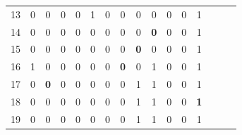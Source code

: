 \begin{esempio}
\begin{table}[H]
\begin{tabular}{c|ccccccccccccccc}
      13 & 0 & 0 & 0 & 0 & 1 & 0 & 0 & 0 & 0 & 0 & 0 & 1 \\
      14 & 0 & 0 & 0 & 0 & 0 & 0 & 0 & 0 & {\color{nordred}\textbf{0}} & 0 & 0
                                                               & 1 \\
      15 & 0 & 0 & 0 & 0 & 0 & 0 & 0 & {\color{nordred}\textbf{0}} & 0 & 0 & 0
                                                               & 1 \\
      16 & 1 & 0 & 0 & 0 & 0 & 0 & {\color{nordred}\textbf{0}} & 0 & 1 & 0 & 0
                                                               & 1 \\
      17 & 0 & {\color{nordred}\textbf{0}} & 0 & 0 & 0 & 0 & 0 & 1 & 1 & 0 & 0
                                                               & 1 \\
      18 & 0 & 0 & 0 & 0 & 0 & 0 & 0 & 1 & 1 & 0 & 0
                                         & {\color{nordred}\textbf{1}} \\ 
      19 & 0 & 0 & 0 & 0 & 0 & 0 & 0 & 1 & 1 & 0 & 0 & 1 \\
    \end{tabular}
  \end{table}
\end{esempio}

